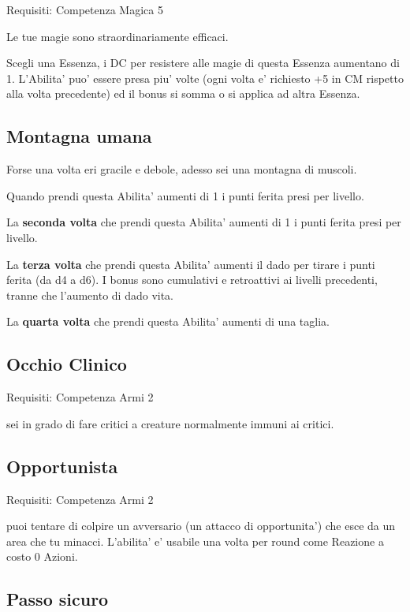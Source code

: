 \documentclass[a4paper,11pt,twoside,openany]{book}
\begin{document}
	Requisiti: Competenza Magica 5
	
	Le tue magie sono straordinariamente efficaci.
	
	Scegli una Essenza, i DC per resistere alle magie di questa Essenza aumentano di 1. L'Abilita' puo' essere presa piu' volte (ogni volta e' richiesto +5 in CM rispetto alla volta precedente) ed il bonus si somma o si applica ad altra Essenza.
	
	\subsection{Montagna umana}
	
	Forse una volta eri gracile e debole, adesso sei una montagna di muscoli.
	
	Quando prendi questa Abilita' aumenti di 1 i punti ferita presi per livello.
	
	La \textbf{seconda volta} che prendi questa Abilita' aumenti di 1 i punti ferita presi per livello. 
	
	La \textbf{terza volta} che prendi questa Abilita' aumenti il dado per tirare i punti ferita (da d4 a d6).
	I bonus sono cumulativi e retroattivi ai livelli precedenti, tranne che l’aumento di dado vita.
	
	La \textbf{quarta volta} che prendi questa Abilita' aumenti di una taglia.
	
	\subsection{Occhio Clinico}
	
	Requisiti: Competenza Armi 2
	
	sei in grado di fare critici a creature normalmente immuni ai critici.
	
	\subsection{Opportunista}
	
	Requisiti: Competenza Armi 2
	
	puoi tentare di colpire un avversario (un attacco di opportunita') che esce da un area che tu minacci. L'abilita' e' usabile una volta per round come Reazione a costo 0 Azioni.
	
	\subsection{Passo sicuro}
	
\end{document}
